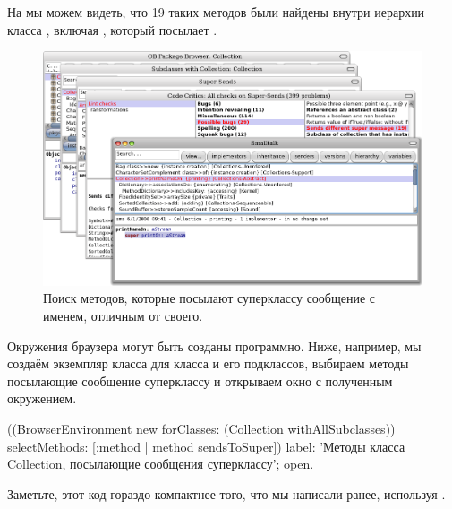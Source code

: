 \documentclass[a4paper,10pt,twoside]{book}
\begin{document}
{%
На  мы можем видеть, что 19 таких методов были найдены внутри иерархии класса , включая , который посылает .
\begin{figure}[ht]\centering
	\includegraphics[width=\linewidth]{sendDifferentSuper}
	\caption{Поиск методов, которые посылают суперклассу сообщение с именем, отличным от своего.\figlabel{sendDifferentSuper}}
\end{figure}

Окружения браузера могут быть созданы программно.
Ниже, например, мы создаём экземпляр класса  для класса  и его подклассов, выбираем методы посылающие сообщение суперклассу и открываем окно с полученным окружением.
\begin{code}{}
((BrowserEnvironment new forClasses: (Collection withAllSubclasses))
	selectMethods: [:method | method sendsToSuper])
	label: 'Методы класса Collection, посылающие сообщения суперклассу';
	open.
\end{code}{}

Заметьте, этот код гораздо компактнее того, что мы написали ранее, используя .

}
\end{document}
